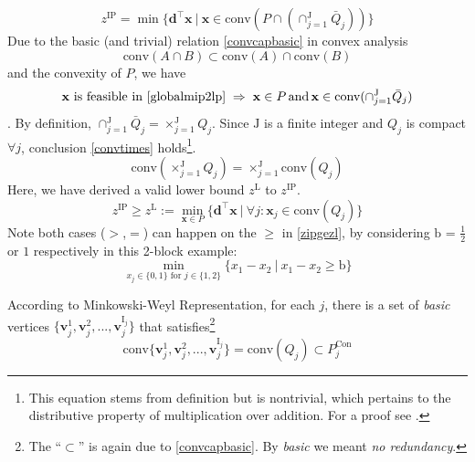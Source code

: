 \documentclass[journal]{IEEEtran}
\begin{document}
\begin{equation}\label{globalmip2lp}
    z^\mathrm{IP} = \min \{\mathbf{d}^\top \mathbf{x}\ | \ \mathbf{x} \in \text{conv}(P \cap (\cap_{j=1}^\mathrm{J} \bar{Q}_j)) \}
\end{equation}
Due to the basic (and trivial) relation \eqref{convcapbasic} in convex analysis 
\begin{equation}\label{convcapbasic}
    \text{conv} (A \cap B) \subset \text{conv} (A) \cap \text{conv} (B)
\end{equation}
and the convexity of $P$, we have
\begin{equation}
    \mathbf{x} \text{ is feasible in } \eqref{globalmip2lp} \; \Rightarrow \; \mathbf{x} \in P \, \text{and} \, \mathbf{x} \in \text{conv}(\cap_{j=1}^\mathrm{J} \bar{Q}_j)
\end{equation}
. By definition, \(\cap_{j=1}^\mathrm{J} \bar{Q}_j = \times_{j=1}^\mathrm{J} Q_j \).
Since $\mathrm{J}$ is a finite integer and $Q_j$ is compact $\forall j$, conclusion \eqref{convtimes} holds\footnote{This
equation stems from definition but is nontrivial, which pertains to the distributive property of multiplication over addition. For a proof see \cite{forumproof}.}.
\begin{equation}\label{convtimes}
    \text{conv}(\times_{j=1}^\mathrm{J} Q_j) = \times_{j=1}^\mathrm{J} \text{conv}(Q_j)
\end{equation}
Here, we have derived a valid lower bound $z^\mathrm{L}$ to $z^\mathrm{IP}$.
\begin{equation}\label{zipgezl}
    z^\mathrm{IP} \ge z^\mathrm{L} := \min_{\mathbf{x} \in P} \{ \mathbf{d}^\top \mathbf{x} \ | \ \forall j: \mathbf{x}_j \in \text{conv}(Q_j) \}
\end{equation}
Note both cases ($>$,$=$) can happen on the $\ge$ in \eqref{zipgezl},
by considering $\mathrm{b}$ = $\frac{1}{2}$ or $1$ respectively
in this 2-block example:
\begin{equation}
    \min_{x_j \in \{0, 1\} \text{ for } j \in \{1,2\}} \{x_1 - x_2 \ |\ x_1 - x_2 \ge \mathrm{b}\}
\end{equation}
\par
According to Minkowski-Weyl Representation, for each $j$, there is a set of \textit{basic} vertices
$\{\mathbf{v}_j^1, \mathbf{v}_j^2, ..., \mathbf{v}_j^{\mathrm{I}_j}\}$ that satisfies\footnote{The ``$\subset$'' is again due to \eqref{convcapbasic}. By \textit{basic} we meant \textit{no redundancy}.}
\begin{equation}\label{enumvertices}
    \text{conv} \{\mathbf{v}_j^1, \mathbf{v}_j^2, ..., \mathbf{v}_j^{\mathrm{I}_j}\} = \text{conv}(Q_j) \subset P^\mathrm{Con}_j
\end{equation}
\end{document}

